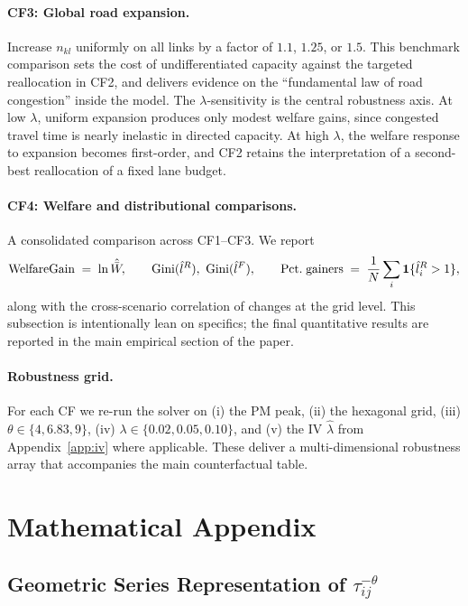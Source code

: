 \paragraph{CF3: Global road expansion.}
Increase $n_{kl}$ uniformly on all links by a factor of $1.1$,
$1.25$, or $1.5$.  This benchmark comparison sets the cost of
undifferentiated capacity against the targeted reallocation in CF2,
and delivers evidence on the ``fundamental law of road congestion''
inside the model.  The $\lambda$-sensitivity is the central
robustness axis.  At low $\lambda$, uniform expansion produces only
modest welfare gains, since congested travel time is nearly
inelastic in directed capacity.  At high $\lambda$, the welfare
response to expansion becomes first-order, and CF2 retains the
interpretation of a second-best reallocation of a fixed lane budget.

\paragraph{CF4: Welfare and distributional comparisons.}
A consolidated comparison across CF1--CF3.  We report
\[
  \mathrm{WelfareGain}\;=\;\ln\hat{\bar W},
  \qquad
  \mathrm{Gini}(\hat l^R),\ \mathrm{Gini}(\hat l^F),
  \qquad
  \mathrm{Pct.\;gainers}\;=\;\frac{1}{N}\sum_i\mathbf 1\{\hat l_i^R>1\},
\]
along with the cross-scenario correlation of changes at the grid
level.  This subsection is intentionally lean on specifics; the
final quantitative results are reported in the main empirical
section of the paper.

\paragraph{Robustness grid.}
For each CF we re-run the solver on (i) the PM peak, (ii) the
hexagonal grid, (iii) $\theta\in\{4,6.83,9\}$, (iv)
$\lambda\in\{0.02,0.05,0.10\}$, and (v) the IV $\hat\lambda$ from
Appendix~\ref{app:iv} where applicable.  These deliver a
multi-dimensional robustness array that accompanies the main
counterfactual table.

\appendix
\section{Mathematical Appendix}\label{app:math}

\subsection{Geometric Series Representation of $\tau_{ij}^{-\theta}$}\label{app:tau}


